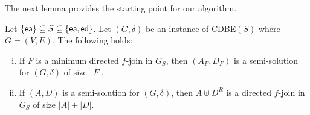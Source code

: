 \documentclass[11pt]{llncs}
\newcommand{\ed}{{\sf ed}}
\newcommand{\ea}{{\sf ea}}
\newcommand{\cdbe}{{\sc CDBE}}
\begin{document}
The next lemma provides the starting point for our algorithm.

\begin{lemma}\label{l-onetoone}
\begin{sloppypar}
Let  $\{\ea\}\subseteq S \subseteq \{\ea,\ed\}$.  Let $(G,\delta)$ be an
instance of \cdbe$(S)$ where $G=(V,E)$. The following holds:
\end{sloppypar}
\begin{enumerate}[(i)]
\renewcommand{\theenumi}{(\roman{enumi})}
\renewcommand\labelenumi{\theenumi}
\item  \label{stat:f-join-is-semisolution} If $F$ is a minimum directed $f$-join in $G_S$, then $(A_F,D_F)$ is
a semi-solution for $(G,\delta)$ of size~$|F|$.
\item \label{stat:semisolution-is-f-join} If $(A,D)$ is a semi-solution for $(G,\delta)$, then $A\uplus D^R$
is a directed $f$-join in~$G_S$ of size $|A|+|D|$.
\end{enumerate}
\end{lemma}
\end{document}
